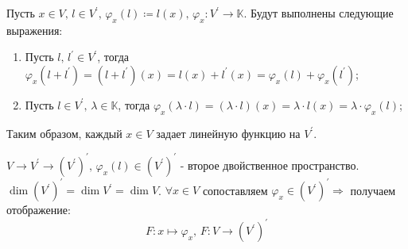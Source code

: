 \documentclass[12pt]{article}
\theoremstyle{definition}
\begin{document}
Пусть $x \in V, \, l \in V^\prime, \, \varphi_x(l) \coloneqq l(x), \, \varphi_x \colon V^\prime \to \mathbb{K}$. Будут выполнены следующие выражения:
\begin{enumerate}[label ={(\arabic*)}]
	\item Пусть $l, \, l^\prime \in V^\prime$, тогда $\varphi_x(l+ l^\prime) = (l + l^\prime)(x) = l(x) + l^\prime(x) = \varphi_x(l) + \varphi_x(l^\prime)$;
	\item Пусть $l \in V^\prime, \, \lambda \in \mathbb{K}$, тогда $\varphi_x(\lambda {\cdot} l) = (\lambda  {\cdot} l)(x) = \lambda {\cdot} l(x) = \lambda {\cdot} \varphi_x(l)$;
\end{enumerate}
Таким образом, каждый $x \in V$ задает линейную функцию на $V^\prime$. 

$V \rightarrow V^\prime \rightarrow (V^\prime)^\prime, \, \varphi_x(l) \in (V^\prime)^\prime$ - второе двойственное пространство. $\dim{(V^\prime)^\prime} = \dim{V^\prime} = \dim{V}$. $\forall x \in V$ сопоставляем $\varphi_x \in (V^\prime)^\prime \Rightarrow$ получаем отображение:
$$F \colon x \mapsto \varphi_x, \, F\colon V \rightarrow (V^\prime)^\prime$$
\end{document}
